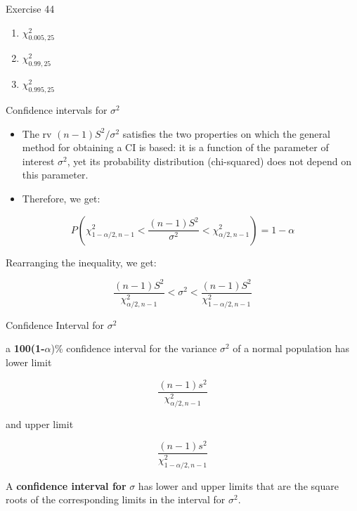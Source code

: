 \documentclass[
  ignorenonframetext,
]{beamer}
\providecommand{\tightlist}{%
  \setlength{\itemsep}{0pt}\setlength{\parskip}{0pt}}\usepackage{longtable,booktabs,array}
\begin{document}
\begin{frame}{Exercise 44}
\protect\hypertarget{exercise-44-1}{}
\begin{enumerate}[<+->]
[a.]
\setcounter{enumi}{3}
\tightlist
\item
  \(\chi^{2}_{0.005, 25}\)
\item
  \(\chi^{2}_{0.99, 25}\)
\item
  \(\chi^{2}_{0.995, 25}\)
\end{enumerate}
\end{frame}

\begin{frame}{Confidence intervals for \(\sigma^{2}\)}
\protect\hypertarget{confidence-intervals-for-sigma2}{}
\begin{itemize}[<+->]
\tightlist
\item
  The rv \((n-1)S^{2}/\sigma^{2}\) satisfies the two properties on which
  the general method for obtaining a CI is based: it is a function of
  the parameter of interest \(\sigma^{2}\), yet its probability
  distribution (chi-squared) does not depend on this parameter.
\item
  Therefore, we get:
\end{itemize}

\[
P\left( \chi^{2}_{1-\alpha/2,n-1} < \frac{(n-1)S^{2}}{\sigma^{2}} < \chi^{2}_{\alpha/2,n-1}\right) = 1-\alpha
\]

Rearranging the inequality, we get:

\[
\frac{(n-1)S^{2}}{\chi^{2}_{\alpha/2,n-1}} < \sigma^{2} < \frac{(n-1)S^{2}}{\chi^{2}_{1-\alpha/2,n-1}}
\]
\end{frame}

\begin{frame}{Confidence Interval for \(\sigma^{2}\)}
\protect\hypertarget{confidence-interval-for-sigma2}{}
\begin{tcolorbox}[enhanced jigsaw, titlerule=0mm, colbacktitle=quarto-callout-important-color!10!white, opacityback=0, bottomrule=.15mm, colback=white, colframe=quarto-callout-important-color-frame, arc=.35mm, title=\textcolor{quarto-callout-important-color}{\faExclamation}\hspace{0.5em}{CI}, toprule=.15mm, breakable, coltitle=black, leftrule=.75mm, bottomtitle=1mm, left=2mm, rightrule=.15mm, toptitle=1mm, opacitybacktitle=0.6]

a \textbf{100(1-}\(\alpha\))\% confidence interval for the variance
\(\sigma^{2}\) of a normal population has lower limit

\[
\frac{(n-1)s^{2}}{\chi^{2}_{\alpha/2,n-1}}
\]

and upper limit

\[
\frac{(n-1)s^{2}}{\chi^{2}_{1-\alpha/2,n-1}}
\]

A \textbf{confidence interval for} \(\sigma\) has lower and upper limits
that are the square roots of the corresponding limits in the interval
for \(\sigma^{2}\).

\end{tcolorbox}
\end{frame}
\end{document}
